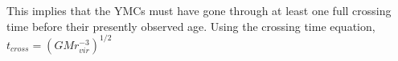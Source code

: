 This implies that the YMCs must have gone through at least one full crossing time before their presently observed age. Using the crossing time equation, $t_{cross}=(GMr_{vir}^{-3})^{1/2}$